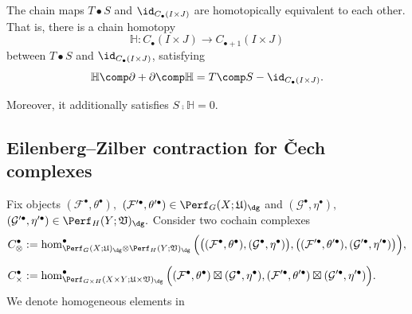 \begin{prop}\label{prp:chain-homotopy-TS}
The chain maps
$T\bullet S$
and
$\id_{C_{\bullet}(I\times J)}$
are homotopically equivalent to each other.
That is,
there is a chain homotopy
$$
\mathbb{H}:
C_{\bullet}(I\times J)
\rightarrow
C_{\bullet+1}(I\times J)
$$
between
$T\bullet S$
and
$\id_{C_{\bullet}(I\times J)}$,
satisfying
$$
\mathbb{H}\comp \partial+\partial\comp \mathbb{H}
=
T\comp S
-
\id_{C_{\bullet}(I\times J)}.
$$

Moreover, it additionally satisfies
$
S\comp \mathbb{H}=0.
$
\end{prop}




\subsection{Eilenberg--Zilber contraction for \v{C}ech complexes}\label{subsec:Eilenberg-Zilber-contraction-Cech}
Fix objects
$
(\mathcal{F}^{\bullet},\theta^{\bullet}),
$
$
(\mathcal{F}'^{\bullet},\theta'^{\bullet})
\in\Perf_G(X;\mathfrak{U})_{\dg}
$
and
$
(\mathcal{G}^{\bullet},\eta^{\bullet}),
$
$
(\mathcal{G}'^{\bullet},\eta'^{\bullet})
\in\Perf_H(Y;\mathfrak{V})_{\dg}.
$
Consider two cochain complexes
\begin{align*}
C_{\otimes}^{\bullet}
&:=
\hom_{
\Perf_G(X;\mathfrak{U})_{\dg}
\otimes
\Perf_H(Y;\mathfrak{V})_{\dg}
}^{\bullet}
\Big(
\big(
(\mathcal{F}^{\bullet},\theta^{\bullet}),
(\mathcal{G}^{\bullet},\eta^{\bullet})
\big),
\big(
(\mathcal{F}'^{\bullet},\theta'^{\bullet}),
(\mathcal{G}'^{\bullet},\eta'^{\bullet})
\big)
\Big),
\\[2mm]
C_{\times}^{\bullet}
&:=
\hom_{\Perf_{G\times H}(X\times Y;\mathfrak{U}\times\mathfrak{V})_{\dg}}^{\bullet}
\Big(
(\mathcal{F}^{\bullet},\theta^{\bullet})
\boxtimes
(\mathcal{G}^{\bullet},\eta^{\bullet}),
(\mathcal{F}'^{\bullet},\theta'^{\bullet})
\boxtimes
(\mathcal{G}'^{\bullet},\eta'^{\bullet})
\Big).
\end{align*}
We denote homogeneous elements in

